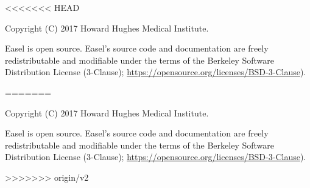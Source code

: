 <<<<<<< HEAD
\vspace*{\fill}
\begin{flushleft}
Copyright (C) 2017 Howard Hughes Medical Institute.

\vspace{2em} 

Easel is open source.  Easel's source code and documentation are
freely redistributable and modifiable under the terms of the Berkeley
Software Distribution License (3-Clause);
\url{https://opensource.org/licenses/BSD-3-Clause}).

\end{flushleft}








=======
\vspace*{\fill}
\begin{flushleft}
Copyright (C) 2017 Howard Hughes Medical Institute.

\vspace{2em} 

Easel is open source.  Easel's source code and documentation are
freely redistributable and modifiable under the terms of the Berkeley
Software Distribution License (3-Clause);
\url{https://opensource.org/licenses/BSD-3-Clause}).

\end{flushleft}








>>>>>>> origin/v2
